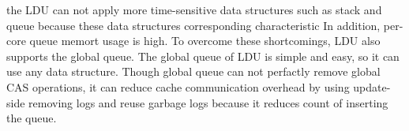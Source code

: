 the LDU can not apply more time-sensitive data structures such as stack and
queue because these data structures corresponding characteristic
In addition, per-core queue memort usage is high.
To overcome these shortcomings, LDU also supports the global queue.
The global queue of LDU is simple and easy, so it can use any data structure.
Though global queue can not perfactly remove global CAS operations, it can
reduce cache communication overhead by using update-side removing
logs and reuse garbage logs because it reduces count of inserting the
queue.
\fi

